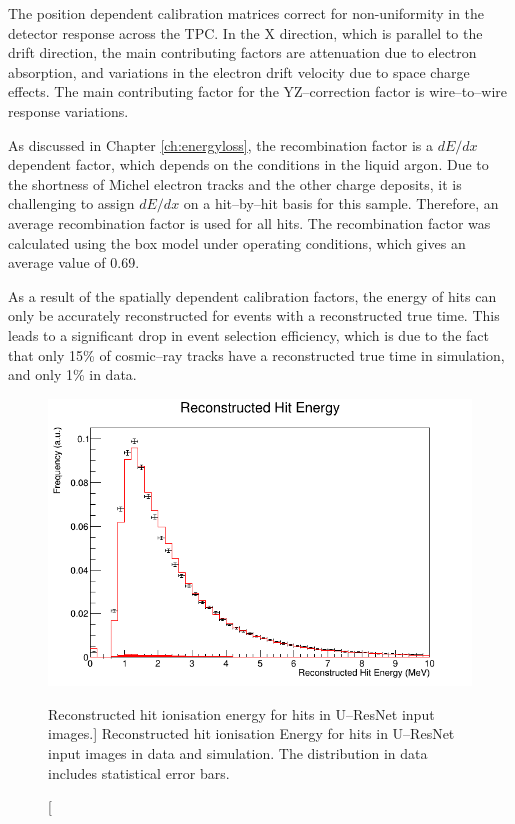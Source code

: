 The position dependent calibration matrices correct for non-uniformity in the
detector response across the TPC. In the X direction, which is parallel to the
drift direction, the main contributing factors are attenuation due to electron 
absorption, and variations in the electron drift velocity due to space charge 
effects. The main contributing factor for the YZ--correction factor is 
wire--to--wire response variations. 

As discussed in Chapter \ref{ch:energyloss}, the recombination factor is a
$dE/dx$ dependent factor, which depends on the conditions in the liquid
argon. Due to the shortness of Michel electron tracks and the other charge 
deposits, it is challenging to assign $dE/dx$ on a hit--by--hit basis for this 
sample. Therefore, an average recombination factor is used for all hits. The 
recombination factor was calculated using the box model\cite{Acciarri2013a} 
under \protodune{} operating conditions, which gives an average value of 0.69.

As a result of the spatially dependent calibration factors, the energy of hits 
can only be accurately reconstructed for events with a reconstructed true 
time. This leads to a significant drop in event selection efficiency, which is 
due to the fact that only 15\% of cosmic--ray tracks have a reconstructed true 
time in simulation, and only 1\% in data.

\begin{figure}
	\centering
	\includegraphics[width=\textwidth]{figures/hit_ion_reco.png}
	\caption
	[Reconstructed hit ionisation energy for hits in U--ResNet input images.]
	{Reconstructed hit ionisation Energy for hits in U--ResNet input images 
	in data and simulation. The distribution in data includes statistical error
	bars.}
	\label{fig:hit_ion_reco}
\end{figure}

